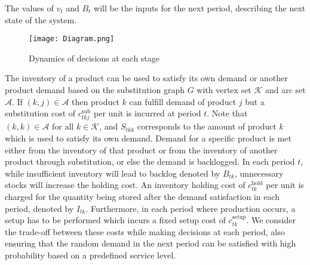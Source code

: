 \documentclass[10pt]{article}
\newcommand{\ti}{t} %
\newcommand{\ka}{k} %
\newcommand{\KA}{\mathcal{K}}
\newcommand{\jey}{j} %
\newcommand{\Graf}{\mathcal{A}} %
\newcommand{\Bi}{B} %
\newcommand{\Vi}{v} %
\begin{document}
The values of $\Vi_{\ti}$ and $\Bi_{\ti}$ will be the inputs for the next period, describing the next state of the system.
\begin{figure}[!h]
\begin{center}
\texttt{[image: Diagram.png]}
\caption{Dynamics of decisions at each stage} 
\label{MultistageDynamics}
\end{center}
\end{figure}


The inventory of a product can be used to satisfy its own demand or another product demand based on the substitution graph $G$ with vertex set $\KA$ and arc set $\Graf$. If $(\ka, \jey) \in \Graf$ then product $\ka$  can fulfill demand of product $\jey$ but a substitution cost of $c^{\text{sub}}_{\ti \ka \jey }$ per unit is incurred at period $\ti$. Note that $(\ka, \ka) \in \Graf  \text{ for all } \ka \in \KA$, and $S_{\ti \ka \ka}$ corresponds to the amount of product $\ka$ which is used to satisfy its own demand.  Demand for a specific product is met either from the inventory of that product or from the inventory of another product through substitution, or else the demand is backlogged. In each period $\ti$, while insufficient inventory will lead to backlog denoted by $\Bi_{\ti \ka}$, unnecessary stocks will increase the holding cost. An inventory holding cost of $c^{\text{hold}}_{\ti \ka}$ per unit is charged for the quantity being stored after the demand satisfaction in each period, denoted by $I_{\ti \ka}$. Furthermore, in each period where production occurs, a setup has to be performed which incurs a fixed setup cost of $c^{\text{setup}}_{\ti \ka}$. We consider the trade-off between these costs while making decisions at each period, also ensuring that the random demand in the next period can be satisfied with high probability based on a predefined service level. 


\end{document}
